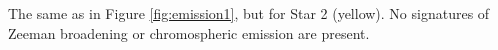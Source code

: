 \label{fig:emission2} The same as in Figure \ref{fig:emission1}, but for Star 2 (yellow). No signatures of Zeeman broadening or chromospheric emission are present.
  